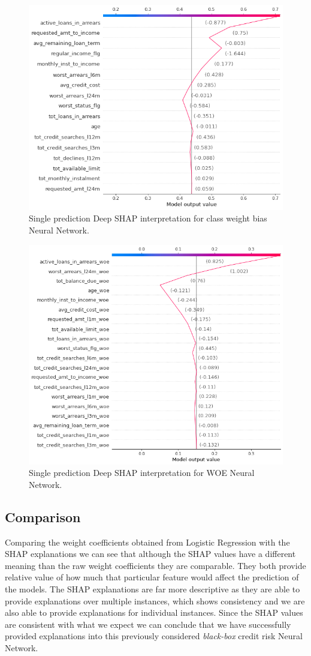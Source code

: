 \begin  {figure}[!htpb]
\centering
  \includegraphics[width=0.8\linewidth]{Credit_Images/shap-nn-weighted-single.png}
   \caption{Single prediction Deep SHAP interpretation for class weight bias Neural Network.}
    \label{fig-deep-shap-weighted-single-NN}
\end{figure}

\begin  {figure}[!htpb]
\centering
  \includegraphics[width=0.8\linewidth]{Credit_Images/WOE_IV_NOSCALE_INDV.png}
   \caption{Single prediction Deep SHAP interpretation for WOE Neural Network.}
    \label{fig-deep-shap-WOE-single-NN}
\end{figure}


\subsection{Comparison} Comparing the weight coefficients obtained from Logistic Regression with the SHAP explanations we can see that although the SHAP values have a different meaning than the raw weight coefficients they are comparable. They both provide relative value of how much that particular feature would affect the prediction of the models. The SHAP explanations are far more descriptive as they are able to provide explanations over multiple instances, which shows consistency and we are also able to provide explanations for individual instances. Since the SHAP values are consistent with what we expect we can conclude that we have successfully provided explanations into this previously considered \emph{black-box} credit risk Neural Network.


